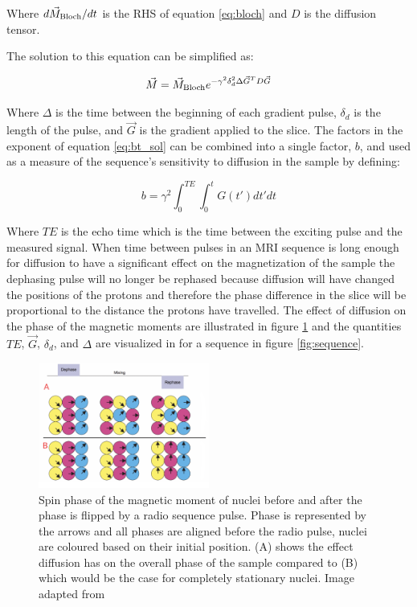Where ${d \vec{M}_{\text{Bloch}}}/{dt}$ is the RHS of equation \ref{eq:bloch} and $D$ is the diffusion tensor. \cite{rohmer2006bloch}


The solution to this equation can be simplified as:

\begin{equation}
    \vec{M} = \vec{M}_{\text{Bloch}} e^{-\gamma^2 \delta^2_d \Delta \vec{G}^T D \vec{G}}
    \label{eq:bt_sol}
\end{equation}

Where $\Delta$ is the time between the beginning of each gradient pulse, $\delta_d$ is the length of the pulse, and $\vec{G}$ is the gradient applied to the slice. The factors in the exponent of equation \ref{eq:bt_sol} can be combined into a single factor, $b$, and used as a measure of the sequence's sensitivity to diffusion in the sample by defining:

\begin{equation}
    b = \gamma^2 \int_0^{TE} \int_0^t G(t') dt' dt
\end{equation}

Where $TE$ is the echo time which is the time between the exciting pulse and the measured signal. When time between pulses in an MRI sequence is long enough for diffusion to have a significant effect on the magnetization of the sample the dephasing pulse will no longer be rephased because diffusion will have changed the positions of the protons and therefore the phase difference in the slice will be proportional to the distance the protons have travelled. The effect of diffusion on the phase of the magnetic moments are illustrated in figure \ref{fig:phase} and the quantities $TE$, $\vec{G}$, $\delta_d$, and $\Delta$ are visualized in for a \dmri sequence in figure \ref{fig:sequence}.

\begin{figure}
    \includegraphics[width=0.5\textwidth]{figures/phase.png}
    \caption{Spin phase of the magnetic moment of nuclei before and after the phase is flipped by a radio sequence pulse. Phase is represented by the arrows and all phases are aligned before the radio pulse, nuclei are coloured based on their initial position. (A) shows the effect diffusion has on the overall phase of the sample compared to (B) which would be the case for completely stationary nuclei. Image adapted from \cite{mori2007introduction}}
    \label{fig:phase}
\end{figure}

